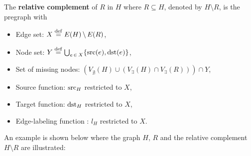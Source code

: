 The \textbf{relative complement} of $R$ in $H$ where $R \mathop{\subseteq} H$, denoted by $H \mathop{\setminus} R$, is the pregraph with
\begin{itemize}
    \item Edge set: $X \overset{\operatorname{def}}{=} E(H) \mathop{\setminus} E(R)$,
    \item Node set: $Y \overset{\operatorname{def}}{=} \bigcup_{e \mathop{\in} X} \{\operatorname{src}(e), \operatorname{dst}(e)\}$,
    \item Set of missing nodes: $
   ( V_{\nexists}(H)  \mathop{\cup}
        (
                  V_\exists(H) 
                  \mathop{\cap} 
                  V_\exists(R)
                  )
   )
        \mathop{\cap}  
        Y
                  $,
    \item Source function: ${\operatorname{src}_H}$ restricted to $X$,
    \item Target function: ${\operatorname{dst}_H}$ restricted to $X$,
    \item Edge-labeling function : $l_H$ restricted to $X$.
\end{itemize}
An example is shown below where the graph $H$, $R$ and the relative complement $H \mathop{\setminus} R$ are illustrated:
